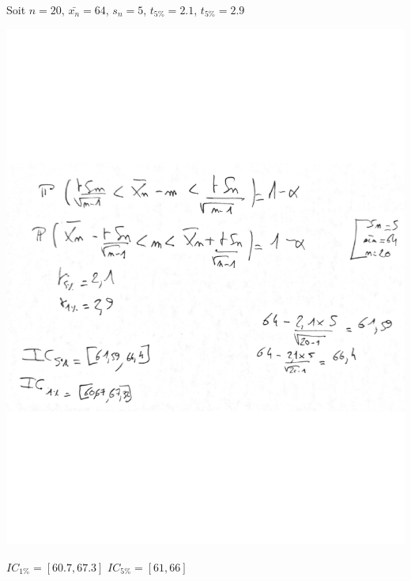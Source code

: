 \documentclass[11pt]{article}
\begin{document}
Soit $n=20$,  $\bar{x_{n}}=64$,  $s_{n}=5$, $t_{5\%} = 2.1$, $t_{5\%} =2.9$ 

\centerline{\includegraphics[scale=0.6]{img/calcul_ic.pdf}}

$IC_{1\%} = [60.7, 67.3]$ \qquad
$IC_{5\%} = [61, 66]$
\end{document}
